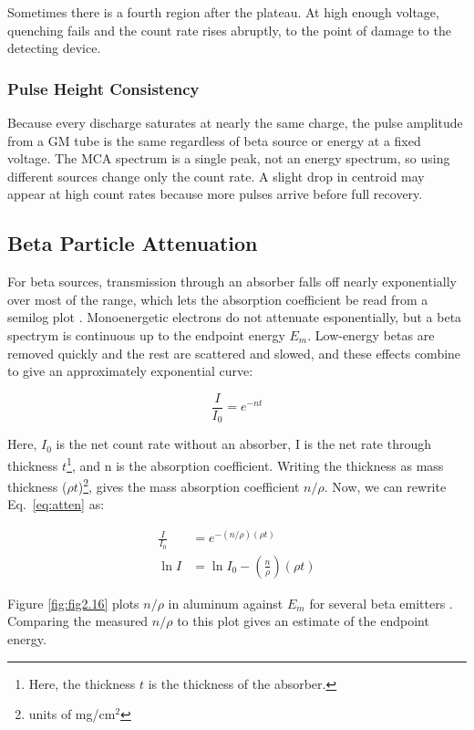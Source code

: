 \documentclass[12pt]{article}
\begin{document}
Sometimes there is a fourth region after the plateau. At high enough voltage, quenching fails and the count rate rises abruptly, to the point of damage to the detecting device.

\subsubsection{Pulse Height Consistency}
\label{subsubsec:heightconsistency}

Because every discharge saturates at nearly the same charge, the pulse amplitude from a GM tube is the same regardless of beta source or energy at a fixed voltage. The MCA spectrum is a single peak, not an energy spectrum, so using different sources change only the count rate. A slight drop in centroid may appear at high count rates because more pulses arrive before full recovery.

\subsection{Beta Particle Attenuation}
\label{subsec:beta_atten}

For beta sources, transmission through an absorber falls off nearly exponentially over most of the range, which lets the absorption coefficient be read from a semilog plot \cite{knoll}. Monoenergetic electrons do not attenuate esponentially, but a beta spectrym is continuous up to the endpoint energy $E_m$. Low-energy betas are removed quickly and the rest are scattered and slowed, and these effects combine to give an approximately exponential curve:

\begin{equation}
    \frac{I}{I_0} = e^{-nt}
    \label{eq:atten}
\end{equation}

Here, $I_0$ is the net count rate without an absorber, I is the net rate through thickness $t$\footnote{Here, the thickness $t$ is the thickness of the absorber.}, and n is the absorption coefficient. Writing the thickness as mass thickness ($\rho t$)\footnote{units of mg/cm$^{2}$}, gives the mass absorption coefficient $n/\rho$. Now, we can rewrite Eq.\ \eqref{eq:atten} as:

\begin{align}
    \frac{I}{I_0} &= e^{-(n/\rho)(\rho t)} \\
    \ln{I} &= \ln{I_0} - \left(\frac{n}{\rho}\right)(\rho t)
\end{align}

Figure \ref{fig:fig2.16} plots $n/\rho$ in aluminum against $E_m$ for several beta emitters \cite{knoll}. Comparing the measured $n/\rho$ to this plot gives an estimate of the endpoint energy.
\end{document}
